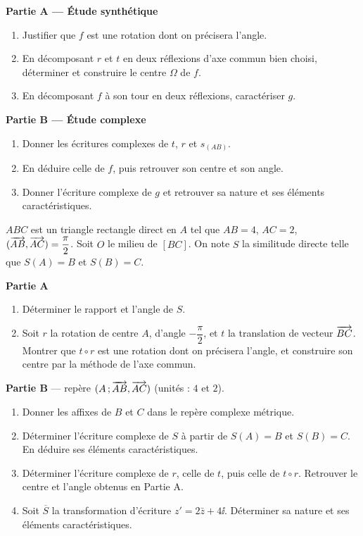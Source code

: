 \textbf{Partie A — Étude synthétique}
\begin{enumerate}
	\item Justifier que $f$ est une rotation dont on précisera l'angle.
	\item En décomposant $r$ et $t$ en deux réflexions d'axe commun bien
	choisi, déterminer et construire le centre $\Omega$ de $f$.
	\item En décomposant $f$ à son tour en deux réflexions, caractériser $g$.
\end{enumerate}

\textbf{Partie B — Étude complexe}
\begin{enumerate}
	\item Donner les écritures complexes de $t$, $r$ et $s_{(AB)}$.
	\item En déduire celle de $f$, puis retrouver son centre et son angle.
	\item Donner l'écriture complexe de $g$ et retrouver sa nature et ses
	éléments caractéristiques.
\end{enumerate}

$ABC$ est un triangle rectangle direct en $A$ tel que $AB = 4$, $AC = 2$,
$(\overrightarrow{AB},\overrightarrow{AC}) = \dfrac{\pi}{2}$. Soit $O$ le milieu de $[BC]$.
On note $S$ la similitude directe telle que $S(A) = B$ et $S(B) = C$.

\textbf{Partie A}
\begin{enumerate}
	\item Déterminer le rapport et l'angle de $S$.
	\item Soit $r$ la rotation de centre $A$, d'angle $-\dfrac{\pi}{2}$, et $t$
	la translation de vecteur $\overrightarrow{BC}$. Montrer que $t\circ r$ est une
	rotation dont on précisera l'angle, et construire son centre par la méthode
	de l'axe commun.
\end{enumerate}

\textbf{Partie B} — repère $(A\,;\overrightarrow{AB},\overrightarrow{AC})$ (unités : $4$ et $2$).
\begin{enumerate}
	\item Donner les affixes de $B$ et $C$ dans le repère complexe métrique.
	\item Déterminer l'écriture complexe de $S$ à partir de $S(A)=B$ et
	$S(B)=C$. En déduire ses éléments caractéristiques.
	\item Déterminer l'écriture complexe de $r$, celle de $t$, puis celle de
	$t\circ r$. Retrouver le centre et l'angle obtenus en Partie A.
	\item Soit $\overline S$ la transformation d'écriture $z' = 2\bar z + 4\ii$.
	Déterminer sa nature et ses éléments caractéristiques.
\end{enumerate}

